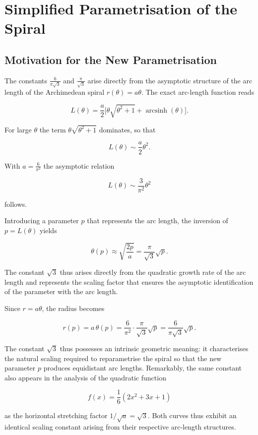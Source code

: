 \chapter{Simplified Parametrisation of the Spiral}
\section{Motivation for the New Parametrisation}
The constants \(\frac{6}{\pi\sqrt{3}}\) and \(\frac{\pi}{\sqrt{3}}\) arise
directly from the asymptotic structure of the arc length of the Archimedean spiral
\(r(\theta)=a\theta\). The exact arc-length function reads


\[
L(\theta)=\frac{a}{2}\bigl[\theta\sqrt{\theta^{2}+1}+\operatorname{arcsinh}(\theta)\bigr].
\]


For large \(\theta\) the term \(\theta\sqrt{\theta^{2}+1}\) dominates, so that


\[
L(\theta)\sim \frac{a}{2}\theta^{2}.
\]


With \(a=\frac{6}{\pi^{2}}\) the asymptotic relation


\[
L(\theta)\sim \frac{3}{\pi^{2}}\theta^{2}
\]


follows.

Introducing a parameter \(p\) that represents the arc length, the inversion
of \(p=L(\theta)\) yields


\[
\theta(p)\approx \sqrt{\frac{2p}{a}}
= \frac{\pi}{\sqrt{3}}\sqrt{p}.
\]


The constant \(\sqrt{3}\) thus arises directly from the quadratic
growth rate of the arc length and represents the scaling factor that
ensures the asymptotic identification of the parameter with the arc length.

Since \(r=a\theta\), the radius becomes


\[
r(p)=a\,\theta(p)
= \frac{6}{\pi^{2}}\cdot\frac{\pi}{\sqrt{3}}\sqrt{p}
= \frac{6}{\pi\sqrt{3}}\sqrt{p}.
\]



The constant \(\sqrt{3}\) thus possesses an intrinsic geometric meaning:
it characterises the natural scaling required to reparametrise the
spiral so that the new parameter \(p\) produces equidistant arc lengths.
Remarkably, the same constant also appears in the analysis of the
quadratic function


\[
f(x)=\frac{1}{6}(2x^{2}+3x+1)
\]


as the horizontal stretching factor \(1/\sqrt{a}=\sqrt{3}\). Both curves
thus exhibit an identical scaling constant arising from their respective
arc-length structures.



